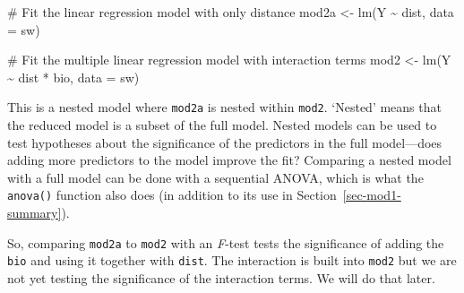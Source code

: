 \documentclass[
  letterpaper,
]{book}
\newenvironment{Shaded}{\begin{snugshade}}{\end{snugshade}}
\newcommand{\AttributeTok}[1]{\textcolor[rgb]{0.40,0.45,0.13}{#1}}
\newcommand{\CommentTok}[1]{\textcolor[rgb]{0.37,0.37,0.37}{#1}}
\newcommand{\FunctionTok}[1]{\textcolor[rgb]{0.28,0.35,0.67}{#1}}
\newcommand{\NormalTok}[1]{\textcolor[rgb]{0.00,0.23,0.31}{#1}}
\newcommand{\OtherTok}[1]{\textcolor[rgb]{0.00,0.23,0.31}{#1}}
\newcommand{\SpecialCharTok}[1]{\textcolor[rgb]{0.37,0.37,0.37}{#1}}
\begin{document}
\begin{Shaded}
\begin{Highlighting}[]
\CommentTok{\# Fit the linear regression model with only distance}
\NormalTok{mod2a }\OtherTok{\textless{}{-}} \FunctionTok{lm}\NormalTok{(Y }\SpecialCharTok{\textasciitilde{}}\NormalTok{ dist, }\AttributeTok{data =}\NormalTok{ sw)}

\CommentTok{\# Fit the multiple linear regression model with interaction terms}
\NormalTok{mod2 }\OtherTok{\textless{}{-}} \FunctionTok{lm}\NormalTok{(Y }\SpecialCharTok{\textasciitilde{}}\NormalTok{ dist }\SpecialCharTok{*}\NormalTok{ bio, }\AttributeTok{data =}\NormalTok{ sw)}
\end{Highlighting}
\end{Shaded}

This is a nested model where \texttt{mod2a} is nested within
\texttt{mod2}. `Nested' means that the reduced model is a subset of the
full model. Nested models can be used to test hypotheses about the
significance of the predictors in the full model---does adding more
predictors to the model improve the fit? Comparing a nested model with a
full model can be done with a sequential ANOVA, which is what the
\texttt{anova()} function also does (in addition to its use in
Section~\ref{sec-mod1-summary}).

So, comparing \texttt{mod2a} to \texttt{mod2} with an \emph{F}-test
tests the significance of adding the \texttt{bio} and using it together
with \texttt{dist}. The interaction is built into \texttt{mod2} but we
are not yet testing the significance of the interaction terms. We will
do that later.
\end{document}
